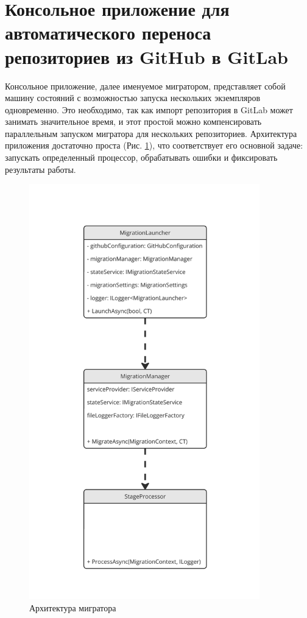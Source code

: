 \section{Консольное приложение для автоматического переноса репозиториев из GitHub в GitLab} \label{sec:gitlab-migrator-app}
Консольное приложение, далее именуемое мигратором, представляет собой машину состояний с возможностью запуска нескольких экземпляров одновременно.
Это необходимо, так как импорт репозитория в GitLab может занимать значительное время, и этот простой можно компенсировать параллельным запуском мигратора для нескольких репозиториев.
Архитектура приложения достаточно проста (Рис. \ref{fig:gitlab-migrator-app-architecture}), что соответствует его основной задаче: запускать определенный процессор, обрабатывать ошибки и фиксировать результаты работы.

\begin{figure}[H]
  \centering
  \includegraphics[width=10cm]{img/gitlab-migrator-app-architecture}
  \caption{Архитектура мигратора}
  \label{fig:gitlab-migrator-app-architecture}
\end{figure}

